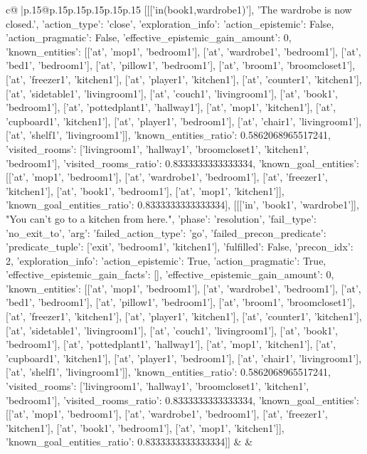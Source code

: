 \documentclass{article}
\begin{document}
{\begin{supertabular}{c@{$\;$}|p{.15\linewidth}@{}p{.15\linewidth}p{.15\linewidth}p{.15\linewidth}p{.15\linewidth}p{.15\linewidth}}
{{{	 [[['in(book1,wardrobe1)'], 'The wardrobe is now closed.', {'action_type': 'close', 'exploration_info': {'action_epistemic': False, 'action_pragmatic': False, 'effective_epistemic_gain_amount': 0, 'known_entities': [['at', 'mop1', 'bedroom1'], ['at', 'wardrobe1', 'bedroom1'], ['at', 'bed1', 'bedroom1'], ['at', 'pillow1', 'bedroom1'], ['at', 'broom1', 'broomcloset1'], ['at', 'freezer1', 'kitchen1'], ['at', 'player1', 'kitchen1'], ['at', 'counter1', 'kitchen1'], ['at', 'sidetable1', 'livingroom1'], ['at', 'couch1', 'livingroom1'], ['at', 'book1', 'bedroom1'], ['at', 'pottedplant1', 'hallway1'], ['at', 'mop1', 'kitchen1'], ['at', 'cupboard1', 'kitchen1'], ['at', 'player1', 'bedroom1'], ['at', 'chair1', 'livingroom1'], ['at', 'shelf1', 'livingroom1']], 'known_entities_ratio': 0.5862068965517241, 'visited_rooms': ['livingroom1', 'hallway1', 'broomcloset1', 'kitchen1', 'bedroom1'], 'visited_rooms_ratio': 0.8333333333333334, 'known_goal_entities': [['at', 'mop1', 'bedroom1'], ['at', 'wardrobe1', 'bedroom1'], ['at', 'freezer1', 'kitchen1'], ['at', 'book1', 'bedroom1'], ['at', 'mop1', 'kitchen1']], 'known_goal_entities_ratio': 0.8333333333333334}}], [[['in', 'book1', 'wardrobe1']], "You can't go to a kitchen from here.", {'phase': 'resolution', 'fail_type': 'no_exit_to', 'arg': {'failed_action_type': 'go', 'failed_precon_predicate': {'predicate_tuple': ['exit', 'bedroom1', 'kitchen1'], 'fulfilled': False, 'precon_idx': 2}}, 'exploration_info': {'action_epistemic': True, 'action_pragmatic': True, 'effective_epistemic_gain_facts': [], 'effective_epistemic_gain_amount': 0, 'known_entities': [['at', 'mop1', 'bedroom1'], ['at', 'wardrobe1', 'bedroom1'], ['at', 'bed1', 'bedroom1'], ['at', 'pillow1', 'bedroom1'], ['at', 'broom1', 'broomcloset1'], ['at', 'freezer1', 'kitchen1'], ['at', 'player1', 'kitchen1'], ['at', 'counter1', 'kitchen1'], ['at', 'sidetable1', 'livingroom1'], ['at', 'couch1', 'livingroom1'], ['at', 'book1', 'bedroom1'], ['at', 'pottedplant1', 'hallway1'], ['at', 'mop1', 'kitchen1'], ['at', 'cupboard1', 'kitchen1'], ['at', 'player1', 'bedroom1'], ['at', 'chair1', 'livingroom1'], ['at', 'shelf1', 'livingroom1']], 'known_entities_ratio': 0.5862068965517241, 'visited_rooms': ['livingroom1', 'hallway1', 'broomcloset1', 'kitchen1', 'bedroom1'], 'visited_rooms_ratio': 0.8333333333333334, 'known_goal_entities': [['at', 'mop1', 'bedroom1'], ['at', 'wardrobe1', 'bedroom1'], ['at', 'freezer1', 'kitchen1'], ['at', 'book1', 'bedroom1'], ['at', 'mop1', 'kitchen1']], 'known_goal_entities_ratio': 0.8333333333333334}}]] 
	  } 
	   } 
	   } 
	 & & \\ 
 


\end{supertabular}}
\end{document}
